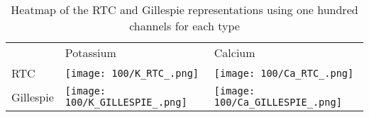 \begin{table}[]
    \centering
    \begin{tabular}{lll}
    & Potassium & Calcium\\
    RTC & 
    \texttt{[image: 100/K\_RTC\_.png]} & 
    \texttt{[image: 100/Ca\_RTC\_.png]} \\ 
    Gillespie & 
    \texttt{[image: 100/K\_GILLESPIE\_.png]} & 
        \texttt{[image: 100/Ca\_GILLESPIE\_.png]} \\ 
    \end{tabular}
    \caption{Heatmap of the RTC and Gillespie representations using one hundred channels for each type}
    \label{tab:my_label}
\end{table}

